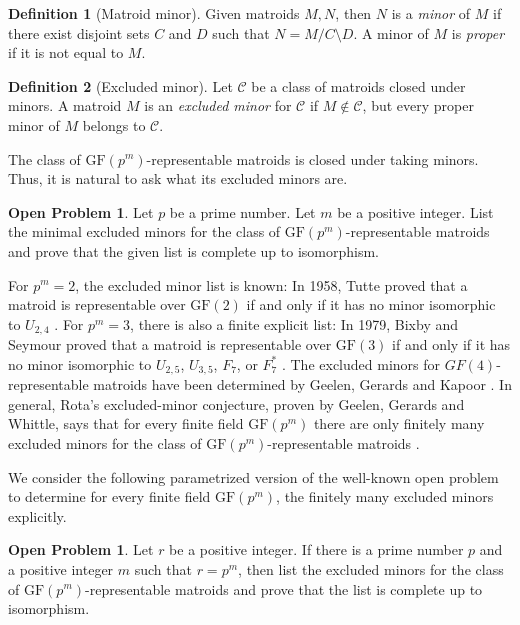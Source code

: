 \documentclass[12pt]{article}
\numberwithin{equation}{section}
\theoremstyle{definition}
\newtheorem{definition}{Definition}
\newtheorem{openproblem}[theorem]{Open Problem}
\begin{document}
\begin{enumerate}
\begin{definition}[Matroid minor]
Given matroids $M,N$, then $N$ is a \emph{minor} of $M$ if there exist disjoint sets $C$ and $D$ such that $N = M/C \setminus D$. A minor of $M$ is \textit{proper} if it is not equal to $M$.
\end{definition}

\begin{definition}[Excluded minor]
Let $\mathcal C$ be a class of matroids closed under minors. A matroid $M$ is an \emph{excluded minor} for $\mathcal C$ if $M\notin \mathcal C$, but every proper minor of $M$ belongs to $\mathcal C$.
\end{definition}

The class of $\mathrm{GF}(p^m)$-representable matroids is closed under taking minors. Thus, it is natural to ask what its excluded minors are.

\begin{openproblem}
Let $p$ be a prime number. Let $m$ be a positive integer. List the minimal excluded minors for the class of $\mathrm{GF}(p^m)$-representable matroids and prove that the given list is complete up to isomorphism.
\end{openproblem}

For $p^m=2$, the excluded minor list is known: In 1958, Tutte proved that a matroid is representable over $\mathrm{GF}(2)$ if and only if it has no minor isomorphic to $U_{2,4}$ \cite{Tutte1958Homotopy}. For $p^m=3$, there is also a finite explicit list: In 1979, Bixby and Seymour proved that a matroid is representable over $\mathrm{GF}(3)$ if and only if it has no minor isomorphic to $U_{2,5}$, $U_{3,5}$, $F_7$, or $F_7^*$ \cite{Bixby1979Reid,Seymour1979GF3}.
The excluded minors for $GF(4)$-representable matroids have been determined by Geelen, Gerards and Kapoor \cite{GeelenGerardsKapoor2000GF4}.
In general, Rota's excluded-minor conjecture, proven by Geelen, Gerards and Whittle, says that for every finite field $\mathrm{GF}(p^m)$ there are only finitely many excluded minors for the class of $\mathrm{GF}(p^m)$-representable matroids \cite{Rota1971Combinatorial, GeelenGerardsWhittle2014Solving}. 

We consider the following parametrized version of the well-known open problem to determine  for every finite field $\mathrm{GF}(p^m)$, the finitely many excluded minors explicitly.
\begin{openproblem}
Let $r$ be a positive integer. If there is a prime number $p$ and a positive integer $m$ such that $r=p^m$, then list the excluded minors for the class of $\mathrm{GF}(p^m)$-representable matroids and prove that the list is complete up to isomorphism.
\end{openproblem}



\end{enumerate}
\end{document}
